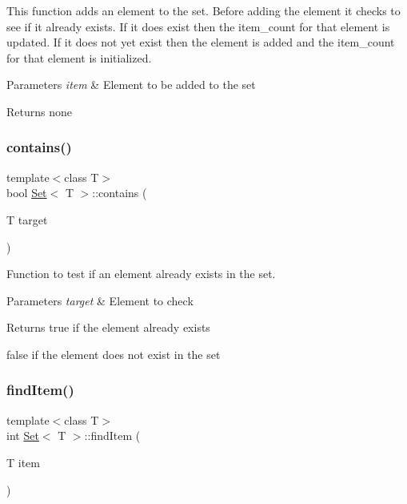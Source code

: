 This function adds an element to the set. Before adding the element it checks to see if it already exists. If it does exist then the item\+\_\+count for that element is updated. If it does not yet exist then the element is added and the item\+\_\+count for that element is initialized.


\begin{DoxyParams}{Parameters}
{\em item} & Element to be added to the set \\
\hline
\end{DoxyParams}
\begin{DoxyReturn}{Returns}
none 
\end{DoxyReturn}
\mbox{\label{class_set_ae87a06144566865cc26a21e2ad96d214}} 
\subsubsection{\texorpdfstring{contains()}{contains()}}
{\footnotesize\ttfamily template$<$class T$>$ \\
bool \hyperlink{class_set}{Set}$<$ T $>$\+::contains (\begin{DoxyParamCaption}\item[{T}]{target }\end{DoxyParamCaption})}

Function to test if an element already exists in the set.


\begin{DoxyParams}{Parameters}
{\em target} & Element to check \\
\hline
\end{DoxyParams}
\begin{DoxyReturn}{Returns}
true if the element already exists 

false if the element does not exist in the set 
\end{DoxyReturn}
\mbox{\label{class_set_a573c96681af42c868e736f1c503a2443}} 
\subsubsection{\texorpdfstring{find\+Item()}{findItem()}}
{\footnotesize\ttfamily template$<$class T$>$ \\
int \hyperlink{class_set}{Set}$<$ T $>$\+::find\+Item (\begin{DoxyParamCaption}\item[{T}]{item }\end{DoxyParamCaption})}

